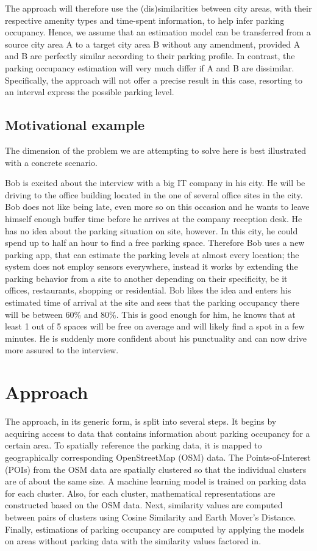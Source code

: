\documentclass{ws-ijait}
\begin{document}
	The approach will therefore use the (dis)similarities between city areas, with their respective amenity types and time-spent information, to help infer parking occupancy. Hence, we assume that an estimation model can be transferred from a source city area A to a target city area B without any amendment, provided A and B are perfectly similar according to their parking profile. In contrast, the parking occupancy estimation will very much differ if A and B are dissimilar. Specifically, the approach will not offer a precise result in this case, resorting to an interval express the possible parking level.
	
	\subsection{Motivational example}
	The dimension of the problem we are attempting to solve here is best illustrated with a concrete scenario.
	
	Bob is excited about the interview with a big IT company in his city. He will be driving to the office building located in the one of several office sites in the city. Bob does not like being late, even more so on this occasion and he wants to leave himself enough buffer time before he arrives at the company reception desk. He has no idea about the parking situation on site, however. In this city, he could spend up to half an hour to find a free parking space. Therefore Bob uses a new parking app, that can estimate the parking levels at almost every location; the system does not employ sensors everywhere, instead it works by extending the parking behavior from a site to another depending on their specificity, be it offices, restaurants, shopping or residential. Bob likes the idea and enters his estimated time of arrival at the site and sees that the parking occupancy there will be between 60\% and 80\%. This is good enough for him, he knows that at least 1 out of 5 spaces will be free on average and will likely find a spot in a few minutes. He is suddenly more confident about his punctuality and can now drive more assured to the interview.
		
	\section{Approach}
	The approach, in its generic form, is split into several steps. It begins by acquiring access to data that contains information about parking occupancy for a certain area. To spatially reference the parking data, it is mapped to geographically corresponding OpenStreetMap (OSM) data. The Points-of-Interest (POIs) from the OSM data are spatially clustered so that the individual clusters are of about the same size. A machine learning model is trained on parking data for each cluster. Also, for each cluster, mathematical representations are constructed based on the OSM data. Next, similarity values are computed between pairs of clusters using Cosine Similarity and Earth Mover's Distance. Finally, estimations of parking occupancy are computed by applying the models on areas without parking data with the similarity values factored in.   
	
\end{document}
